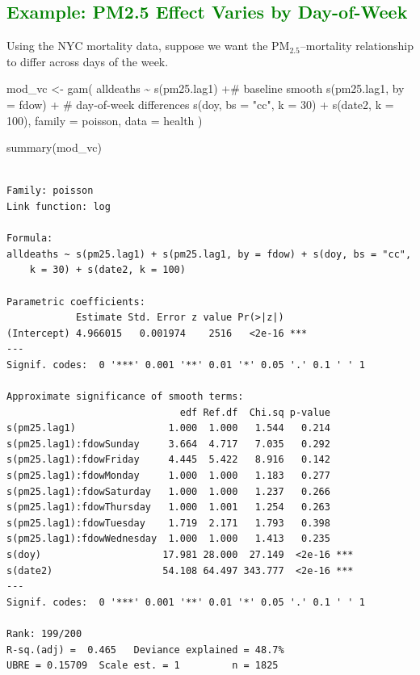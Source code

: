 \documentclass[
  letterpaper,
  DIV=11,
  numbers=noendperiod]{scrreprt}
\newenvironment{Shaded}{\begin{snugshade}}{\end{snugshade}}
\newcommand{\AttributeTok}[1]{\textcolor[rgb]{0.40,0.45,0.13}{#1}}
\newcommand{\CommentTok}[1]{\textcolor[rgb]{0.37,0.37,0.37}{#1}}
\newcommand{\DecValTok}[1]{\textcolor[rgb]{0.68,0.00,0.00}{#1}}
\newcommand{\FunctionTok}[1]{\textcolor[rgb]{0.28,0.35,0.67}{#1}}
\newcommand{\NormalTok}[1]{\textcolor[rgb]{0.00,0.23,0.31}{#1}}
\newcommand{\OtherTok}[1]{\textcolor[rgb]{0.00,0.23,0.31}{#1}}
\newcommand{\SpecialCharTok}[1]{\textcolor[rgb]{0.37,0.37,0.37}{#1}}
\newcommand{\StringTok}[1]{\textcolor[rgb]{0.13,0.47,0.30}{#1}}
\begin{document}
\hypertarget{section-40}{%
\subsection*{\texorpdfstring{\textcolor{green}{Example: PM2.5 Effect Varies by Day-of-Week}}{}}\label{section-40}}

Using the NYC mortality data, suppose we want the
PM\(_{2.5}\)--mortality relationship to differ across days of the week.

\begin{Shaded}
\begin{Highlighting}[]
\NormalTok{mod\_vc }\OtherTok{\textless{}{-}} \FunctionTok{gam}\NormalTok{(}
\NormalTok{  alldeaths }\SpecialCharTok{\textasciitilde{}} 
    \FunctionTok{s}\NormalTok{(pm25.lag1) }\SpecialCharTok{+}\CommentTok{\# baseline smooth}
    \FunctionTok{s}\NormalTok{(pm25.lag1, }\AttributeTok{by =}\NormalTok{ fdow) }\SpecialCharTok{+} \CommentTok{\# day{-}of{-}week differences}
    \FunctionTok{s}\NormalTok{(doy, }\AttributeTok{bs =} \StringTok{"cc"}\NormalTok{, }\AttributeTok{k =} \DecValTok{30}\NormalTok{) }\SpecialCharTok{+}
    \FunctionTok{s}\NormalTok{(date2, }\AttributeTok{k =} \DecValTok{100}\NormalTok{),}
  \AttributeTok{family =}\NormalTok{ poisson,}
  \AttributeTok{data =}\NormalTok{ health}
\NormalTok{)}

\FunctionTok{summary}\NormalTok{(mod\_vc)}
\end{Highlighting}
\end{Shaded}

\begin{verbatim}

Family: poisson 
Link function: log 

Formula:
alldeaths ~ s(pm25.lag1) + s(pm25.lag1, by = fdow) + s(doy, bs = "cc", 
    k = 30) + s(date2, k = 100)

Parametric coefficients:
            Estimate Std. Error z value Pr(>|z|)    
(Intercept) 4.966015   0.001974    2516   <2e-16 ***
---
Signif. codes:  0 '***' 0.001 '**' 0.01 '*' 0.05 '.' 0.1 ' ' 1

Approximate significance of smooth terms:
                              edf Ref.df  Chi.sq p-value    
s(pm25.lag1)                1.000  1.000   1.544   0.214    
s(pm25.lag1):fdowSunday     3.664  4.717   7.035   0.292    
s(pm25.lag1):fdowFriday     4.445  5.422   8.916   0.142    
s(pm25.lag1):fdowMonday     1.000  1.000   1.183   0.277    
s(pm25.lag1):fdowSaturday   1.000  1.000   1.237   0.266    
s(pm25.lag1):fdowThursday   1.000  1.001   1.254   0.263    
s(pm25.lag1):fdowTuesday    1.719  2.171   1.793   0.398    
s(pm25.lag1):fdowWednesday  1.000  1.000   1.413   0.235    
s(doy)                     17.981 28.000  27.149  <2e-16 ***
s(date2)                   54.108 64.497 343.777  <2e-16 ***
---
Signif. codes:  0 '***' 0.001 '**' 0.01 '*' 0.05 '.' 0.1 ' ' 1

Rank: 199/200
R-sq.(adj) =  0.465   Deviance explained = 48.7%
UBRE = 0.15709  Scale est. = 1         n = 1825
\end{verbatim}
\end{document}
